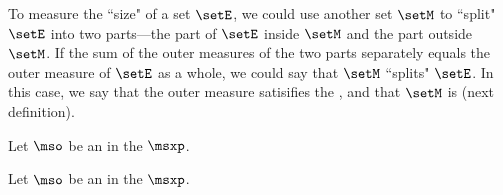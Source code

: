 {To measure the ``size" of a set $\setE$, we could use another set $\setM$ to ``split" $\setE$ into 
two parts---the part of $\setE$ inside $\setM$ and the part outside $\setM$.
If the sum of the outer measures of the two parts separately equals the outer measure of $\setE$
as a whole, we could say that $\setM$ ``splits" $\setE$.
In this case, we say that the outer measure satisifies the ,
and that $\setM$ is  (next definition).
\begin{definition}
\label{def:mso_m}
Let $\mso$ be an  in the  $\msxp$.
\end{definition}


\begin{definition}
\label{def:null_set}
Let $\mso$ be an  in the  $\msxp$.
\end{definition}

}
